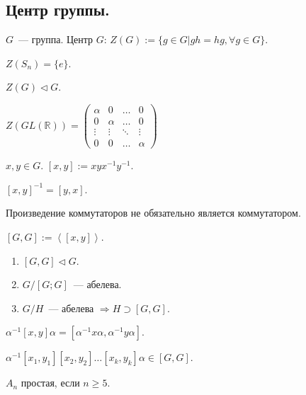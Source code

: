 \documentclass[12pt]{article}
\begin{document}
	\subsection{Центр группы.}
	\begin{definition}
		$G$~--- группа. Центр $G$: $Z(G) := \{ g \in G | gh = hg, \forall g \in G \}$.
	\end{definition}
	\begin{statement}
		$Z(S_n) = \{ e \}$.
	\end{statement}
	\begin{theorem}
		$Z(G) \vartriangleleft G$.
	\end{theorem}
	\begin{statement}
		$Z(GL(\mathbb{R})) = \begin{pmatrix}
			\alpha & 0 & \dots & 0 \\
			0 & \alpha & \dots & 0 \\
			\vdots & \vdots & \ddots & \vdots \\
			0 & 0 & \dots & \alpha
		\end{pmatrix}$
	\end{statement}
	\begin{definition}[Коммутатор]
		$x, y \in G$. $[x, y] := xyx^{-1}y^{-1}$.
	\end{definition}
	\begin{statement}
		$[x, y]^{-1} = [y, x]$.
	\end{statement}
	\begin{note}
		Произведение коммутаторов не обязательно является коммутатором.
	\end{note}
	\begin{definition}[Коммутант]
		$[G, G] := \left< [x, y] \right>$.
	\end{definition}
	\begin{theorem}
		\begin{enumerate}
			\item $[G, G] \vartriangleleft G$.
			\item $G / [G; G]$~--- абелева.
			\item $G / H$~--- абелева $\Rightarrow H \supset [G, G]$.
		\end{enumerate}
	\end{theorem}
	\begin{statement}
		$\alpha^{-1} [x, y] \alpha = [\alpha^{-1} x \alpha, \alpha^{-1} y \alpha]$.
	\end{statement}
	\begin{statement}
		$\alpha^{-1} [x_1, y_1] [x_2, y_2] \dots [x_k, y_k] \alpha \in [G, G]$.
	\end{statement}
	\begin{theorem}[Галуа.]
		$A_n$ простая, если $n \geqslant 5$.
	\end{theorem}
	
\end{document}
